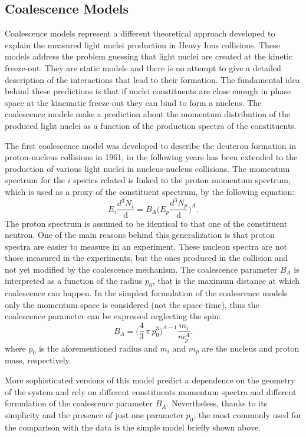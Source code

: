 %
\subsection{Coalescence Models} \label{sec:1.4.2}

Coalescence models \cite{deuprod} represent a different theoretical approach developed to explain 
the measured light nuclei production in Heavy Ions collisions. 
These models address the problem guessing that light nuclei are created at the kinetic freeze-out. 
They are static models and there is no attempt to give a detailed description of the 
interactions that lead to their formation.
The fundamental idea behind these predictions is that if nuclei constituents are close enough in 
phase space at the kinematic freeze-out they can bind to form a nucleus. 
The coalescence models make a prediction about the momentum distribution of the produced light 
nuclei as a function of the production spectra of the constituents.

The first coalescence model was developed to describe the deuteron formation in
proton-nucleus collisions in 1961, in the following years has been extended to 
the production of various light nuclei in nucleus-nucleus collisions.
The momentum spectrum for the $i$ species related is linked to the proton momentum spectrum,
which is used as a proxy of the constituent spectrum, by the following equation:
\begin{equation}
    E_{i} \frac{d^{3}N_{i}}{\mathop{dp_{i}^{3}}} = B_{A} \Big( E_{p} \frac{d^{3}N_{p}}{\mathop{dp_{p}^{3}}} \Big)^{A}.
\end{equation}
The proton spectrum is assumed to be identical to that one of the constituent neutron.
One of the main reasons behind this generalization is that proton spectra are easier to measure
in an experiment.
These nucleon spectra are not those measured in the experiments, but the ones produced in the 
collision and not yet modified by the coalescence mechanism.
The coalescence parameter $B_{A}$ is interpreted as a function of the radius $p_{0}$, that 
is the maximum distance at which coalescence can happen.
In the simplest formulation of the coalescence models only the momentum space is considered
(not the space-time), thus the coalescence parameter can be expressed neglecting the spin:
\begin{equation} 
    B_{A} = \Big( \frac{4}{3}\, \pi \,p_{0}^3 \Big)^{A-1} \frac{m_{i}}{m_{p}^{A}}.
\end{equation}
where $p_{0}$ is the aforementioned radius and $m_{i}$ and $m_{p}$ are the nucleus and proton
mass, respectively.

More sophisticated versions of this model predict a dependence on the geometry of the system
and rely on different constituents momentum spectra and different formulation of 
the coalescence parameter $B_{A}$. Nevertheless, thanks to its simplicity and the presence
of just one parameter $p_{0}$, the most commonly used for the comparison with the data is
the simple model briefly shown above.
